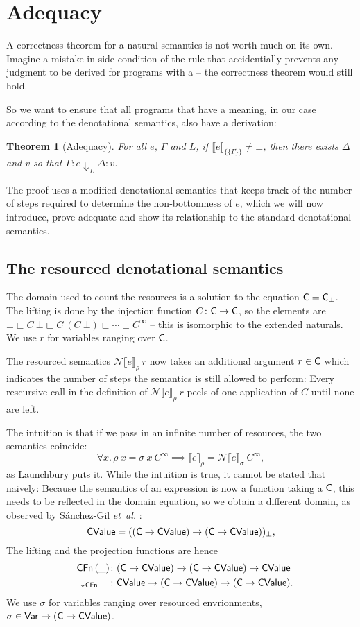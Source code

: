 \documentclass{jfp1}
\newtheorem{theorem}{Theorem}
\theoremstyle{nonumberbreak}
\newcommand{\sVar}   {\text{\textsf{Var}}}
\newcommand{\sCValue}{\text{\textsf{CValue}}}
\newcommand{\sC}     {\text{\textsf{C}}}
\newcommand{\sCFn}[1]{\text{\textsf{CFn}}\,(#1)}
\newcommand{\sCFnProj}[2]{#1\,\downarrow_{\text{\textsf{CFn}}}\,#2}
\newcommand{\keyword}[1]{\text{\textsf{#1}}}
\newcommand{\sred}[5]{#1 : #2 \Downarrow_{#3} #4 : #5}
\newcommand{\sRule}[1]{\text{{\textsc{#1}}}}
\newcommand{\dsem}[2]{\llbracket #1 \rrbracket_{#2}}
\newcommand{\esem}[1]{\{\!\!\!\{#1\}\!\!\!\}}
\newcommand{\dsemr}[2]{\mathcal N\!\llbracket #1 \rrbracket_{#2}}
\begin{document}
\section{Adequacy}

A correctness theorem for a natural semantics is not worth much on its own. Imagine a mistake in side condition of the \sRule{Let} rule that accidentially prevents any judgment to be derived for programs with a \keyword{let} -- the correctness theorem would still hold.

So we want to ensure that all programs that have a meaning, in our case according to the denotational semantics, also have a derivation:

\begin{theorem}[Adequacy]
For all $e$, $\Gamma$ and $L$, if $\dsem{e}{\esem{\Gamma}} \ne \bot$, then there exists $\Delta$ and $v$ so that $\sred \Gamma e L \Delta v$.
\label{thm_adequacy}
\end{theorem}

The proof uses a modified denotational semantics that keeps track of the number of steps required to determine the non-bottomness of $e$, which we will now introduce, prove adequate and show its relationship to the standard denotational semantics.

\subsection{The resourced denotational semantics}

The domain used to count the resources is a solution to the equation $\sC = \sC_\bot$. The lifting is done by the injection function $C \colon \sC \to \sC$, so the elements are $\bot \sqsubset C~\bot \sqsubset C~(C~\bot) \sqsubset \cdots \sqsubset C^\infty$ – this is isomorphic to the extended naturals. We use $r$ for variables ranging over $\sC$.


The resourced semantics $\dsemr{e}{\rho}~r$ now takes an additional argument $r \in \sC$ which indicates the number of steps the semantics is still allowed to perform: Every rescursive call in the definition of $\dsemr{e}{\rho}~r$ peels of one application of $C$ until none are left.

The intuition is that if we pass in an infinite number of resources, the two semantics coincide: \[
\forall x.\, \rho~x = \sigma~x~C^\infty \implies \dsem{e}{\rho} = \dsemr{e}{\sigma}~C^\infty,
\]
as Launchbury puts it. While the intuition is true, it cannot be stated that naively: Because the semantics of an expression is now a function taking a $\sC$, this needs to be reflected in the domain equation, so we obtain a different domain, as observed by S{\'a}nchez-Gil {\em et~al.} :
\[
\sCValue = ((\sC \to \sCValue) \to (\sC \to \sCValue))_\bot,
\]
The lifting and the projection functions are hence
\begin{align*}
\sCFn \_ &\colon (\sC \to \sCValue) \to (\sC \to \sCValue) \to \sCValue \\
\sCFnProj{\_}{\_} &\colon \sCValue \to (\sC\to\sCValue) \to (\sC \to \sCValue).
\end{align*}
We use $\sigma$ for variables ranging over resourced envrionments, $\sigma \in \sVar \to (\sC \to \sCValue)$.
\end{document}
